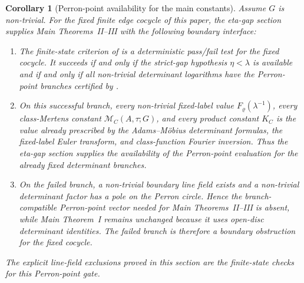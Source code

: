 \documentclass[11pt,a4paper]{amsart}
\theoremstyle{plain}
\newtheorem{corollary}[theorem]{Corollary}
\theoremstyle{definition}
\theoremstyle{remark}
\begin{document}
\begin{corollary}[Perron-point availability for the main constants]
  \label{thm:eta-gap-diagnostic-interface}
  \label{cor:eta-gap-boundary-interface}
  \label{cor:eta-gap-diagnostic-interface}
  Assume \(G\) is non-trivial.  For the fixed finite edge cocycle of this
  paper, the eta-gap section supplies Main Theorems~II--III with the following
  boundary interface:
  \begin{enumerate}[label=\textup{(\roman*)},leftmargin=*]
    \item The finite-state criterion of
       is a deterministic
      pass/fail test for the fixed cocycle.  It succeeds if and only if the
      strict-gap hypothesis \(\eta<\lambda\) is available and if and only if
      all non-trivial determinant logarithms have the Perron-point branches
      certified by .
    \item On this successful branch, every non-trivial fixed-label value
      \(F_\varrho(\lambda^{-1})\), every class-Mertens constant
      \(\mathcal M_C(A,\tau;G)\), and every product constant \(K_C\) is the
      value already prescribed by the Adams--M\"obius determinant formulas,
      the fixed-label Euler transform, and class-function Fourier inversion.
      Thus the eta-gap section supplies the availability of the Perron-point
      evaluation for the already fixed determinant branches.
    \item On the failed branch, a non-trivial boundary line field exists and
      a non-trivial determinant factor has a pole on the Perron circle.  Hence
      the branch-compatible Perron-point vector needed for Main Theorems~II--III
      is absent, while Main Theorem~I remains unchanged because it uses
      open-disc determinant identities.
      The failed branch is therefore a boundary obstruction for the fixed
      cocycle.
  \end{enumerate}
  The explicit line-field exclusions proved in this section are the finite-state
  checks for this Perron-point gate.
\end{corollary}
\end{document}

